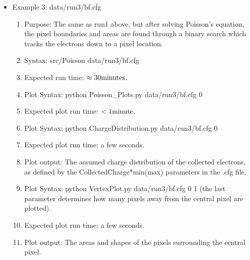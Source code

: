 \documentclass{article} %
\begin{document}
\begin{itemize}
      \item Example 3: data/run3/bf.cfg
    \begin{enumerate}
      \item Purpose: The same as run1 above, but after solving Poisson's equation, the pixel boundaries and areas are found through a binary search which tracks the electrons down to a pixel location. 
      \item Syntax: src/Poisson data/run3/bf.cfg
      \item Expected run time: $\rm \approx 30 minutes$.
      \item Plot Syntax: python Poisson\_Plots.py data/run3/bf.cfg 0
      \item Expected plot run time: $\rm <1 minute$.
      \item Plot Syntax: python ChargeDistribution.py data/run3/bf.cfg 0
      \item Expected plot run time: a few seconds.
      \item Plot output: The assumed charge distribution of the collected electrons, as defined by the CollectedCharge*min(max) parameters in the .cfg file.
      \item Plot Syntax: python VertexPlot.py data/run3/bf.cfg 0 1 (the last parameter determines how many pixels away from the central pixel are plotted).
      \item Expected plot run time: a few seconds.
      \item Plot output: The areas and shapes of the pixels surrounding the central pixel.

    \end{enumerate}


\end{itemize}
\end{document}
